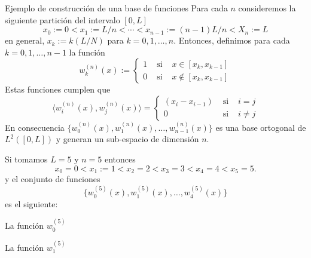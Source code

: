 \documentclass[10pt,handout]{beamer}
\theoremstyle{plain} %
\theoremstyle{plain} %
\theoremstyle{plain} %
\theoremstyle{plain} %
\theoremstyle{definition}
\theoremstyle{example}
\theoremstyle{example}
\theoremstyle{remark}
\theoremstyle{remark}
\begin{document}
\begin{frame}{Ejemplo de construcción de una base de funciones}
Para cada $n$ consideremos la siguiente partición del intervalo $[0,L]$
$$
 x_0:=0 < x_1:= L/n  < \cdots < x_{n-1}:=(n-1)L/n< X_n := L
$$
en general, $x_k := k(L/N)$ para $k=0,1,\ldots,n.$ Entonces, definimos para cada
$k=0,1,\ldots,n-1$ la función
$$
w_k^{(n)}(x):=\left\{
\begin{array}{ccc}
1 & \text{ si } & x \in [x_k,x_{k-1}] \\ 
0 & \text{ si } & x \notin [x_k,x_{k-1}]
\end{array}
\right.
$$
Estas funciones cumplen que
$$
\langle w_i^{(n)}(x) , w_j^{(n)}(x)  \rangle =\left\{
\begin{array}{ccc}
(x_i-x_{i-1}) & \text{ si } & i=j \\ 
0 & \text{ si } & i \ne j
\end{array}
\right.
$$
En consecuencia $\{w_0^{(n)}(x),w_1^{(n)}(x),\ldots,w_{n-1}^{(n)}(x)\}$ es una base ortogonal
de $L^2([0,L])$ y generan un sub-espacio de dimensión $n.$
\end{frame}
\begin{frame}
Si tomamos $L=5$ y $n=5$ entonces
$$
x_0=0 < x_1:= 1 < x_2 = 2 < x_3=3 < x_4= 4 < x_5 = 5.
$$
y el conjunto de funciones
$$
\{w_0^{(5)}(x),w_1^{(5)}(x),\ldots,w_{4}^{(5)}(x)\}
$$
es el siguiente:
\end{frame}


\begin{frame}{La función $w_0^{(5)}$}
\end{frame}

\begin{frame}{La función $w_1^{(5)}$}
\end{frame}
\end{document}
